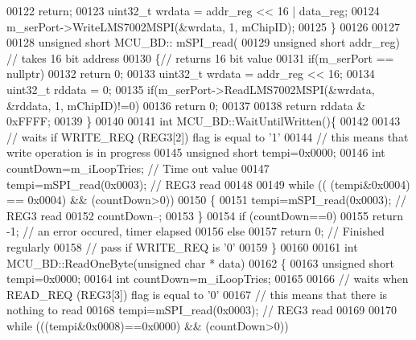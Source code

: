 \begin{DoxyCode}
00122         \textcolor{keywordflow}{return};
00123     uint32\_t wrdata = addr\_reg << 16 | data\_reg;
00124     m\_serPort->WriteLMS7002MSPI(&wrdata, 1, mChipID);
00125 \}
00126 
00127 
00128 \textcolor{keywordtype}{unsigned} \textcolor{keywordtype}{short} MCU\_BD:: mSPI\_read(
00129             \textcolor{keywordtype}{unsigned} \textcolor{keywordtype}{short} addr\_reg)  \textcolor{comment}{// takes 16 bit address}
00130 \{\textcolor{comment}{// returns 16 bit value}
00131     \textcolor{keywordflow}{if}(m\_serPort == \textcolor{keyword}{nullptr})
00132         \textcolor{keywordflow}{return} 0;
00133     uint32\_t wrdata = addr\_reg << 16;
00134     uint32\_t rddata = 0;
00135     \textcolor{keywordflow}{if}(m\_serPort->ReadLMS7002MSPI(&wrdata, &rddata, 1, mChipID)!=0)
00136         \textcolor{keywordflow}{return} 0;
00137 
00138     \textcolor{keywordflow}{return} rddata & 0xFFFF;
00139 \}
00140 
00141 \textcolor{keywordtype}{int} MCU\_BD::WaitUntilWritten()\{
00142 
00143      \textcolor{comment}{// waits if WRITE\_REQ (REG3[2]) flag is equal to '1'}
00144      \textcolor{comment}{// this means that  write operation is in progress}
00145     \textcolor{keywordtype}{unsigned} \textcolor{keywordtype}{short} tempi=0x0000;
00146     \textcolor{keywordtype}{int} countDown=m\_iLoopTries;  \textcolor{comment}{// Time out value}
00147     tempi=mSPI\_read(0x0003); \textcolor{comment}{// REG3 read}
00148 
00149     \textcolor{keywordflow}{while} (( (tempi&0x0004) == 0x0004) && (countDown>0))
00150     \{
00151         tempi=mSPI\_read(0x0003); \textcolor{comment}{// REG3 read}
00152         countDown--;
00153     \}
00154     \textcolor{keywordflow}{if} (countDown==0)
00155         \textcolor{keywordflow}{return} -1; \textcolor{comment}{// an error occured, timer elapsed}
00156     \textcolor{keywordflow}{else}
00157         \textcolor{keywordflow}{return} 0; \textcolor{comment}{// Finished regularly}
00158     \textcolor{comment}{// pass if WRITE\_REQ is '0'}
00159 \}
00160 
00161 \textcolor{keywordtype}{int} MCU\_BD::ReadOneByte(\textcolor{keywordtype}{unsigned} \textcolor{keywordtype}{char} * data)
00162 \{
00163     \textcolor{keywordtype}{unsigned} \textcolor{keywordtype}{short} tempi=0x0000;
00164     \textcolor{keywordtype}{int} countDown=m\_iLoopTries;
00165 
00166      \textcolor{comment}{// waits when READ\_REQ (REG3[3]) flag is equal to '0'}
00167      \textcolor{comment}{// this means that there is nothing to read}
00168     tempi=mSPI\_read(0x0003); \textcolor{comment}{// REG3 read}
00169 
00170     \textcolor{keywordflow}{while} (((tempi&0x0008)==0x0000) && (countDown>0))

\end{DoxyCode}
